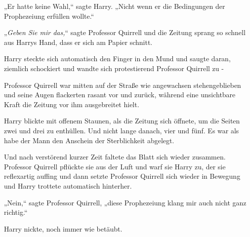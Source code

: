 „Er hatte keine Wahl,“ sagte Harry. „Nicht wenn er die Bedingungen der Prophezeiung erfüllen wollte.“

„\emph{Geben Sie mir das,}“ sagte Professor Quirrell und die Zeitung sprang so schnell aus Harrys Hand, dass er sich am Papier schnitt.

Harry steckte sich automatisch den Finger in den Mund und saugte daran, ziemlich schockiert und wandte sich protestierend Professor Quirrell zu -

Professor Quirrell war mitten auf der Straße wie angewachsen stehengeblieben und seine Augen flackerten rasant vor und zurück, während eine unsichtbare Kraft die Zeitung vor ihm ausgebreitet hielt.

Harry blickte mit offenem Staunen, als die Zeitung sich öffnete, um die Seiten zwei und drei zu enthüllen. Und nicht lange danach, vier und fünf. Es war als habe der Mann den Anschein der Sterblichkeit abgelegt.

Und nach verstörend kurzer Zeit faltete das Blatt sich wieder zusammen. Professor Quirrell pflückte sie aus der Luft und warf sie Harry zu, der sie reflexartig auffing und dann setzte Professor Quirrell sich wieder in Bewegung und Harry trottete automatisch hinterher.

„Nein,“ sagte Professor Quirrell, „diese Prophezeiung klang mir auch nicht ganz richtig.“

Harry nickte, noch immer wie betäubt.

